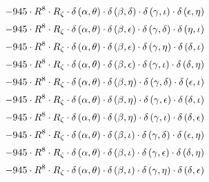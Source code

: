 \begin{subequations}
\begin{gather}
 \\[0.2em] \notag 		 - 945 \cdot R^{8} \cdot R_{\zeta{}} \cdot \delta{}\left(\alpha{}, \theta{}\right) \cdot \delta{}\left(\beta{}, \delta{}\right) \cdot \delta{}\left(\gamma{}, \iota{}\right) \cdot \delta{}\left(\epsilon{}, \eta{}\right) 
 \\[0.2em] \notag 		 - 945 \cdot R^{8} \cdot R_{\zeta{}} \cdot \delta{}\left(\alpha{}, \theta{}\right) \cdot \delta{}\left(\beta{}, \epsilon{}\right) \cdot \delta{}\left(\gamma{}, \delta{}\right) \cdot \delta{}\left(\eta{}, \iota{}\right) 
 \\[0.2em] \notag 		 - 945 \cdot R^{8} \cdot R_{\zeta{}} \cdot \delta{}\left(\alpha{}, \theta{}\right) \cdot \delta{}\left(\beta{}, \epsilon{}\right) \cdot \delta{}\left(\gamma{}, \eta{}\right) \cdot \delta{}\left(\delta{}, \iota{}\right) 
 \\[0.2em] \notag 		 - 945 \cdot R^{8} \cdot R_{\zeta{}} \cdot \delta{}\left(\alpha{}, \theta{}\right) \cdot \delta{}\left(\beta{}, \epsilon{}\right) \cdot \delta{}\left(\gamma{}, \iota{}\right) \cdot \delta{}\left(\delta{}, \eta{}\right) 
 \\[0.2em] \notag 		 - 945 \cdot R^{8} \cdot R_{\zeta{}} \cdot \delta{}\left(\alpha{}, \theta{}\right) \cdot \delta{}\left(\beta{}, \eta{}\right) \cdot \delta{}\left(\gamma{}, \delta{}\right) \cdot \delta{}\left(\epsilon{}, \iota{}\right) 
 \\[0.2em] \notag 		 - 945 \cdot R^{8} \cdot R_{\zeta{}} \cdot \delta{}\left(\alpha{}, \theta{}\right) \cdot \delta{}\left(\beta{}, \eta{}\right) \cdot \delta{}\left(\gamma{}, \epsilon{}\right) \cdot \delta{}\left(\delta{}, \iota{}\right) 
 \\[0.2em] \notag 		 - 945 \cdot R^{8} \cdot R_{\zeta{}} \cdot \delta{}\left(\alpha{}, \theta{}\right) \cdot \delta{}\left(\beta{}, \eta{}\right) \cdot \delta{}\left(\gamma{}, \iota{}\right) \cdot \delta{}\left(\delta{}, \epsilon{}\right) 
 \\[0.2em] \notag 		 - 945 \cdot R^{8} \cdot R_{\zeta{}} \cdot \delta{}\left(\alpha{}, \theta{}\right) \cdot \delta{}\left(\beta{}, \iota{}\right) \cdot \delta{}\left(\gamma{}, \delta{}\right) \cdot \delta{}\left(\epsilon{}, \eta{}\right) 
 \\[0.2em] \notag 		 - 945 \cdot R^{8} \cdot R_{\zeta{}} \cdot \delta{}\left(\alpha{}, \theta{}\right) \cdot \delta{}\left(\beta{}, \iota{}\right) \cdot \delta{}\left(\gamma{}, \epsilon{}\right) \cdot \delta{}\left(\delta{}, \eta{}\right) 
 \\[0.2em] \notag 		 - 945 \cdot R^{8} \cdot R_{\zeta{}} \cdot \delta{}\left(\alpha{}, \theta{}\right) \cdot \delta{}\left(\beta{}, \iota{}\right) \cdot \delta{}\left(\gamma{}, \eta{}\right) \cdot \delta{}\left(\delta{}, \epsilon{}\right) 

\end{gather}
\end{subequations}
